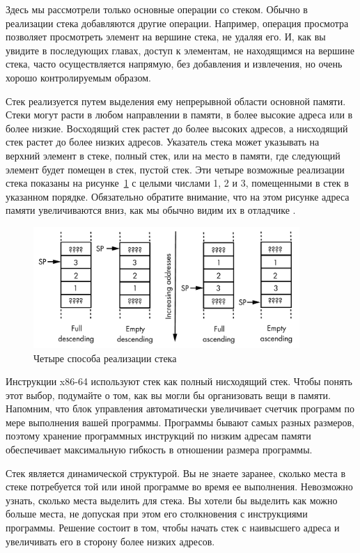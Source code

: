 Здесь мы рассмотрели только основные операции со стеком. Обычно в реализации стека добавляются другие операции. Например, операция просмотра позволяет просмотреть элемент на вершине стека, не удаляя его. И, как вы увидите в последующих главах, доступ к элементам, не находящимся на вершине стека, часто осуществляется напрямую, без добавления и извлечения, но очень хорошо контролируемым образом.

Стек реализуется путем выделения ему непрерывной области основной памяти. Стеки могут расти в любом направлении в памяти, в более высокие адреса или в более низкие. Восходящий стек растет до более высоких адресов, а нисходящий стек растет до более низких адресов. Указатель стека может указывать на верхний элемент в стеке, полный стек, или на место в памяти, где следующий элемент будет помещен в стек, пустой стек. Эти четыре возможные реализации стека показаны на рисунке~\ref{fig11-3} с целыми числами 1, 2 и 3, помещенными в стек в указанном порядке. Обязательно обратите внимание, что на этом рисунке адреса памяти увеличиваются вниз, как мы обычно видим их в отладчике .

\begin{figure}[htbp]
    \centering
    \includegraphics[width=0.9\textwidth]{img/fig11-3.png}
    \caption{Четыре способа реализации стека}
    \label{fig11-3}
\end{figure}

Инструкции x86-64 используют стек как полный нисходящий стек. Чтобы понять этот выбор, подумайте о том, как вы могли бы организовать вещи в памяти. Напомним, что блок управления автоматически увеличивает счетчик программ по мере выполнения вашей программы. Программы бывают самых разных размеров, поэтому хранение программных инструкций по низким адресам памяти обеспечивает максимальную гибкость в отношении размера программы.

Стек является динамической структурой. Вы не знаете заранее, сколько места в стеке потребуется той или иной программе во время ее выполнения. Невозможно узнать, сколько места выделить для стека. Вы хотели бы выделить как можно больше места, не допуская при этом его столкновения с инструкциями программы. Решение состоит в том, чтобы начать стек с наивысшего адреса и увеличивать его в сторону более низких адресов.

